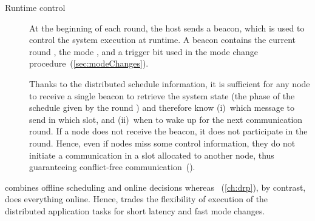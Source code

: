 \begin{description}
	\item[Runtime control]
	At the beginning of each round, the host sends a beacon, which is used to control the system execution at runtime.
	A beacon contains the current round \id, the mode \id, and a trigger bit \SB used in the mode change procedure~(\cref{sec:modeChanges}).

	Thanks to the distributed schedule information, it is sufficient for any node to receive a single beacon to retrieve the system state (\ie the phase of the schedule given by the round \id) and therefore know
		(i)~which message to send in which slot, and
		(ii)~when to wake up for the next communication round.
	If a node does not receive the beacon, it does not participate in the round. Hence, even if nodes miss some control information, they do not initiate a communication in a slot allocated to another node, thus guaranteeing conflict-free communication~().

\end{description}

\squarepar{%
	By globally optimizing the entire system schedule, \TTW can meet tight end-to-end deadlines (tens of \ms) while minimizing the energy spent for wireless communication, thus addressing the \feature{Timeliness} and \feature{Efficiency} requirements.
	The runtime control based on beacons provides \feature{Reliability}, while switching between multiple operation modes at runtime offers some degree of \feature{Adaptability}.
	Finally, \feature{Mobility} is supported by design thanks to the stateless logic of Glossy~\cite{ferrari2011Glossy}, the underlying communication primitive used by \TTW.%
}

\begin{remark}
	\TTW combines offline scheduling and online decisions whereas \DRP~(\cref{ch:drp}), by contrast, does everything online.
	Hence, \TTW trades the flexibility of execution of the distributed application tasks for short latency and fast mode changes.
\end{remark}
